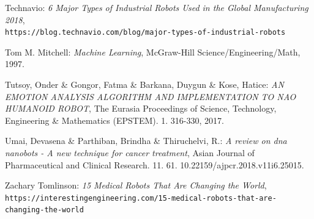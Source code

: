 \documentclass[runningheads,a4paper,12pt]{report}
\begin{document}
\begin{thebibliography}{9}
Technavio:
\textit{6 Major Types of Industrial Robots Used in the Global Manufacturing 2018}, 
\\\texttt{https://blog.technavio.com/blog/major-types-of-industrial-robots}

Tom M. Mitchell: 
\textit{Machine Learning},
McGraw-Hill Science/Engineering/Math,
1997.

Tutsoy, Onder \& Gongor, Fatma \& Barkana, Duygun \& Kose, Hatice:
\textit{AN EMOTION ANALYSIS ALGORITHM AND IMPLEMENTATION TO NAO HUMANOID ROBOT}, 
The Eurasia Proceedings of Science, Technology, Engineering \& Mathematics (EPSTEM). 1. 316-330, 2017. 

Umai, Devasena \& Parthiban, Brindha \& Thiruchelvi, R.:
\textit{A review on dna nanobots - A new technique for cancer treatment},
Asian Journal of Pharmaceutical and Clinical Research. 11. 61. 10.22159/ajpcr.2018.v11i6.25015. 

Zachary Tomlinson:
\textit{15 Medical Robots That Are Changing the World},
\texttt{https://interestingengineering.com/15-medical-robots-that-are-changing-the-world}

\end{thebibliography}
\end{document}
